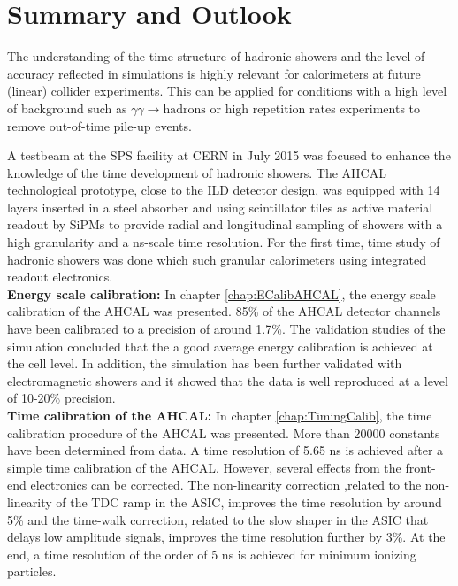 \section{Summary and Outlook}

The understanding of the time structure of hadronic showers and the level of accuracy reflected in \geant simulations is highly relevant for calorimeters at future (linear) collider experiments. This can be applied for conditions with a high level of background such as $\gamma\gamma \rightarrow \text{hadrons}$ or high repetition rates experiments to remove out-of-time pile-up events.

A testbeam at the SPS facility at CERN in July 2015 was focused to enhance the knowledge of the time development of hadronic showers. The AHCAL technological prototype, close to the ILD detector design, was equipped with 14 layers inserted in a steel absorber and using scintillator tiles as active material readout by SiPMs to provide radial and longitudinal sampling of showers with a high granularity and a ns-scale time resolution. For the first time, time study of hadronic showers was done which such granular calorimeters using integrated readout electronics.\\[0.1cm]

\noindent\textbf{Energy scale calibration:} In chapter \ref{chap:ECalibAHCAL}, the energy scale calibration of the AHCAL was presented. 85\% of the AHCAL detector channels have been calibrated to a precision of around 1.7\%. The validation studies of the simulation concluded that the a good average energy calibration is achieved at the cell level. In addition, the simulation has been further validated with electromagnetic showers and it showed that the data is well reproduced at a level of 10-20\% precision.\\[0.1cm]

\noindent\textbf{Time calibration of the AHCAL:} In chapter \ref{chap:TimingCalib}, the time calibration procedure of the AHCAL was presented. More than 20000 constants have been determined from data. A time resolution of 5.65 ns is achieved after a simple time calibration of the AHCAL. However, several effects from the front-end electronics can be corrected. The non-linearity correction ,related to the non-linearity of the TDC ramp in the ASIC, improves the time resolution by around 5\% and the time-walk correction, related to the slow shaper in the ASIC that delays low amplitude signals, improves the time resolution further by 3\%. At the end, a time resolution of the order of 5 ns is achieved for minimum ionizing particles.\\[0.1cm]

